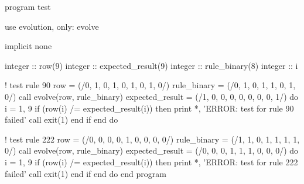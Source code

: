 \begin{codebox}[fortran]
program test

  use evolution, only: evolve
  
  implicit none
  
  integer :: row(9)
  integer :: expected_result(9)
  integer :: rule_binary(8)
  integer :: i
  
  ! test rule 90
  row = (/0, 1, 0, 1, 0, 1, 0, 1, 0/)
  rule_binary = (/0, 1, 0, 1, 1, 0, 1, 0/)
  call evolve(row, rule_binary)
  expected_result = (/1, 0, 0, 0, 0, 0, 0, 0, 1/)
  do i = 1, 9
    if (row(i) /= expected_result(i)) then
        print *, 'ERROR: test for rule 90 failed'
        call exit(1)
    end if
  end do
  
  ! test rule 222
  row = (/0, 0, 0, 0, 1, 0, 0, 0, 0/)
  rule_binary = (/1, 1, 0, 1, 1, 1, 1, 0/)
  call evolve(row, rule_binary)
  expected_result = (/0, 0, 0, 1, 1, 1, 0, 0, 0/)
  do i = 1, 9
    if (row(i) /= expected_result(i)) then
        print *, 'ERROR: test for rule 222 failed'
        call exit(1)
    end if
  end do
end program
\end{codebox}


